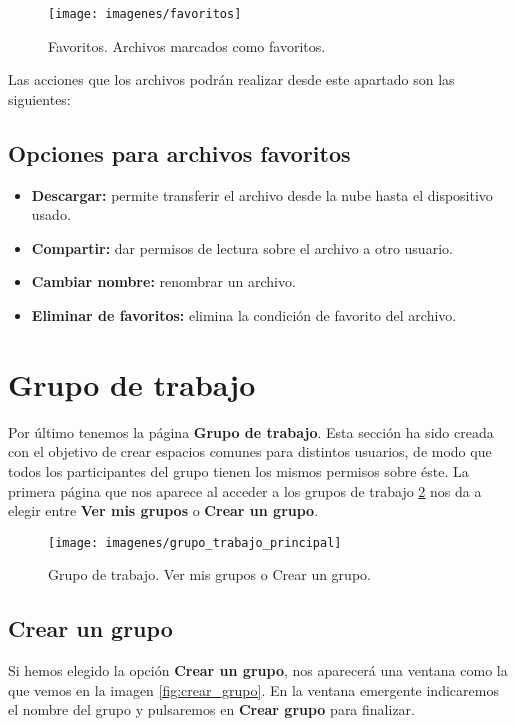 \begin{figure}[H]
	\centering
	\texttt{[image: imagenes/favoritos]}
	\caption{Favoritos. Archivos marcados como favoritos.}
	\label{fig:favoritos}
\end{figure}

Las acciones que los archivos podrán realizar desde este apartado son las siguientes: 

\subsection{Opciones para archivos favoritos}
\begin{itemize}
	\item \textbf{Descargar:} permite transferir el archivo desde la nube hasta el dispositivo usado.
	\item \textbf{Compartir:} dar permisos de lectura sobre el archivo a otro usuario.
	\item \textbf{Cambiar nombre:} renombrar un archivo.
	\item \textbf{Eliminar de favoritos:} elimina la condición de favorito del archivo.
\end{itemize}

\section{Grupo de trabajo}
Por último tenemos la página \textbf{Grupo de trabajo}. Esta sección ha sido creada con el objetivo de crear espacios comunes para distintos usuarios, de modo que todos los participantes del grupo tienen los mismos permisos sobre éste. La primera página que nos aparece al acceder a los grupos de trabajo \ref{fig:grupo_trabajo_principal} nos da a elegir entre \textbf{Ver mis grupos} o \textbf{Crear un grupo}.

\begin{figure}[H]
	\centering
	\texttt{[image: imagenes/grupo\_trabajo\_principal]}
	\caption{Grupo de trabajo. Ver mis grupos o Crear un grupo.}
	\label{fig:grupo_trabajo_principal}
\end{figure}

\subsection{Crear un grupo}
Si hemos elegido la opción \textbf{Crear un grupo}, nos aparecerá una ventana como la que vemos en la imagen \ref{fig:crear_grupo}. En la ventana emergente indicaremos el nombre del grupo y pulsaremos en \textbf{Crear grupo} para finalizar.

